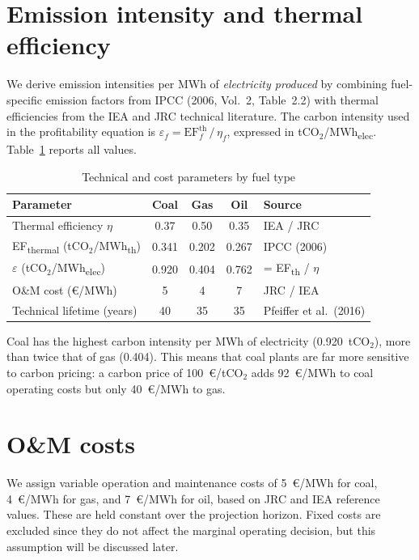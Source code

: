 \documentclass[a4paper, 12pt]{report}
\numberwithin{equation}{chapter}
\numberwithin{figure}{chapter}
\numberwithin{table}{chapter}
\begin{document}
\section{Emission intensity and thermal efficiency}

We derive emission intensities per MWh of \textit{electricity produced} by combining fuel-specific emission factors from IPCC (2006, Vol.~2, Table~2.2) with thermal efficiencies from the IEA and JRC technical literature. The carbon intensity used in the profitability equation is $\varepsilon_f = \text{EF}^{\text{th}}_f \,/\, \eta_f$, expressed in tCO$_2$/MWh\textsubscript{elec}. Table~\ref{tab:parameters} reports all values.

\begin{table}[H]
\centering
\caption{Technical and cost parameters by fuel type}
\label{tab:parameters}
\vspace{0.2cm}
\begin{tabular}{l c c c l}
\toprule
\textbf{Parameter} & \textbf{Coal} & \textbf{Gas} & \textbf{Oil} & \textbf{Source} \\
\midrule
Thermal efficiency $\eta$           & 0.37  & 0.50  & 0.35  & IEA / JRC \\
EF\textsubscript{thermal} (tCO$_2$/MWh\textsubscript{th})  & 0.341 & 0.202 & 0.267 & IPCC (2006) \\
$\varepsilon$ (tCO$_2$/MWh\textsubscript{elec})     & 0.920 & 0.404 & 0.762 & = EF\textsubscript{th} / $\eta$ \\
O\&M cost (\euro/MWh)               & 5     & 4     & 7     & JRC / IEA \\
Technical lifetime (years)          & 40    & 35    & 35    & Pfeiffer et al.\ (2016) \\
\bottomrule
\end{tabular}
\end{table}

Coal has the highest carbon intensity per MWh of electricity (0.920~tCO$_2$), more than twice that of gas (0.404). This means that coal plants are far more sensitive to carbon pricing: a carbon price of 100~\euro/tCO$_2$ adds 92~\euro/MWh to coal operating costs but only 40~\euro/MWh to gas.

\section{O\&M costs}

We assign variable operation and maintenance costs of 5~\euro/MWh for coal, 4~\euro/MWh for gas, and 7~\euro/MWh for oil, based on JRC and IEA reference values. These are held constant over the projection horizon. Fixed costs are excluded since they do not affect the marginal operating decision, but this assumption will be discussed later.
\end{document}
